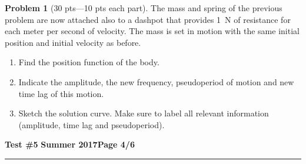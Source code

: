 \documentclass[12pt]{article}
\theoremstyle{definition}
\newtheorem{problem}{Problem}
\begin{document}
\bigskip
\begin{problem}[30 pts---10 pts each part]
The mass and spring of the previous problem are now attached also to a dashpot that provides 1~N of resistance for each meter per second of velocity.  The mass is set in motion with the same initial position and initial velocity as before.
\begin{enumerate}
  \item Find the position function of the body.
  \vspace{4cm}
  \begin{flushright}
  \end{flushright}
  \item Indicate the amplitude, the new frequency, pseudoperiod of motion and new time lag of this motion.
  \vspace{4cm}
  \begin{flushright}
  \end{flushright}
  \item Sketch the solution curve.  Make sure to label all relevant information (amplitude, time lag and pseudoperiod).
\end{enumerate}
\end{problem} 

\newpage

\hfill{\large\bf Test \#5}\hfill{\large\bf
  Summer 2017}\hfill{\large\bf Page 4/6}\hrule
\end{document}
